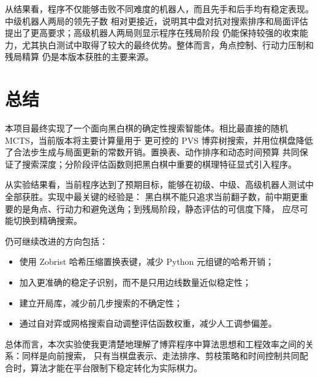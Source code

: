 从结果看，程序不仅能够击败不同难度的机器人，而且先手和后手均有稳定表现。中级机器人两局的领先子数
相对更接近，说明其中盘对抗对搜索排序和局面评估提出了更高要求；高级机器人两局则显示程序在残局阶段
仍能保持较强的收束能力，尤其执白测试中取得了较大的最终优势。整体而言，角点控制、行动力压制和残局精算
仍是本版本获胜的主要来源。

\section{总结}

本项目最终实现了一个面向黑白棋的确定性搜索智能体。相比最直接的随机 MCTS，当前版本将主要计算量用于
更可控的 PVS 博弈树搜索，并用位棋盘降低了合法步生成与局面更新的常数开销。置换表、动作排序和动态时间预算
共同保证了搜索深度；分阶段评估函数则把黑白棋中重要的棋理特征显式引入程序。

从实验结果看，当前程序达到了预期目标，能够在初级、中级、高级机器人测试中全部获胜。实现中最关键的经验是：
黑白棋不能只追求当前翻子数，前中期更重要的是角点、行动力和避免送角；到残局阶段，静态评估的可信度下降，
应尽可能切换到精确搜索。

仍可继续改进的方向包括：
\begin{itemize}
    \item 使用 Zobrist 哈希压缩置换表键，减少 Python 元组键的哈希开销；
    \item 加入更准确的稳定子识别，而不是只用边线数量近似稳定性；
    \item 建立开局库，减少前几步搜索的不确定性；
    \item 通过自对弈或网格搜索自动调整评估函数权重，减少人工调参偏差。
\end{itemize}

总体而言，本次实验使我更清楚地理解了博弈程序中算法思想和工程效率之间的关系：同样是向前搜索，
只有当棋盘表示、走法排序、剪枝策略和时间控制共同配合时，算法才能在平台限制下稳定转化为实际棋力。
